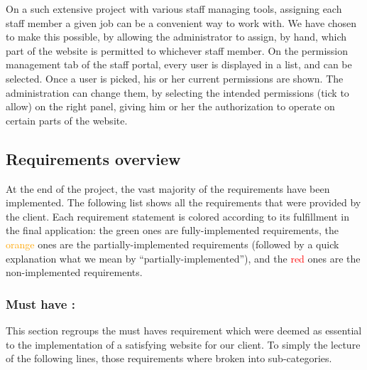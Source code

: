 On a such extensive project with various staff managing tools, assigning
each staff member a given job can be a convenient way to work with. We have
chosen to make this possible, by allowing the administrator to assign, by hand,
which part of the website is permitted to whichever staff member.
On the permission management tab of the staff portal, every user is displayed
in a list, and can be selected. Once a user is picked, his or her current
permissions are shown. The administration can change them, by selecting
the intended permissions (tick to allow) on the right panel,
giving him or her the authorization to operate on certain parts of the website.

\subsection{Requirements overview}
\label{Requirements overview}

At the end of the project, the vast majority of the requirements have been
implemented. The following list shows all the requirements that were provided
by the client. Each requirement statement is colored according to its
fulfillment in the final application: the \textcolor{green!60!black}{green} ones are fully-implemented
requirements, the \textcolor{orange}{orange} ones are the partially-implemented requirements
(followed by a quick explanation what we mean by
\enquote{partially-implemented}), and the \textcolor{red}{red} ones are the non-implemented
requirements. \newline

\subsubsection{Must have :}
\label{Must have}

This section regroups the must haves requirement which were deemed as essential 
to the implementation of a satisfying website for our client. To simply the lecture
of the following lines, those requirements where broken into sub-categories. \newline

